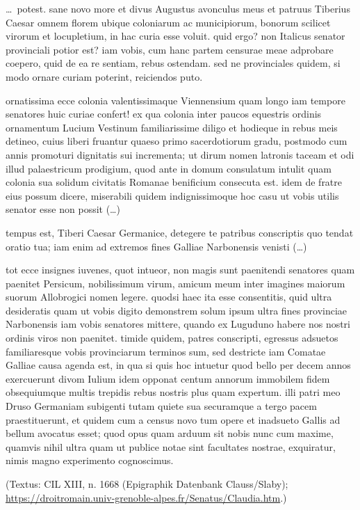 \dots\ potest. sane novo more et divus Augustus avonculus meus et patruus Tiberius Caesar omnem florem ubique coloniarum ac municipiorum, bonorum scilicet virorum et locupletium, in hac curia esse voluit. quid ergo? non Italicus senator provinciali potior est? iam vobis, cum hanc partem censurae meae adprobare coepero, quid de ea re sentiam, rebus ostendam. sed ne provinciales quidem, si modo ornare curiam poterint, reiciendos puto.

ornatissima ecce colonia valentissimaque Viennensium quam longo iam tempore senatores huic curiae confert! ex qua colonia inter paucos equestris ordinis ornamentum Lucium Vestinum familiarissime diligo et hodieque in rebus meis detineo, cuius liberi fruantur quaeso primo sacerdotiorum gradu, postmodo cum annis promoturi dignitatis sui incrementa; ut dirum nomen latronis taceam et odi illud palaestricum prodigium, quod ante in domum consulatum intulit quam colonia sua solidum civitatis Romanae benificium consecuta est. idem de fratre eius possum dicere, miserabili quidem indignissimoque hoc casu ut vobis utilis senator esse non possit (\dots)

tempus est, Tiberi Caesar Germanice, detegere te patribus conscriptis quo tendat oratio tua; iam enim ad extremos fines Galliae Narbonensis venisti (\dots)

tot ecce insignes iuvenes, quot intueor, non magis sunt paenitendi 
senatores quam paenitet Persicum, nobilissimum virum, amicum meum inter imagines maiorum suorum Allobrogici nomen legere. quodsi haec ita esse consentitis, quid ultra desideratis quam ut vobis digito demonstrem solum ipsum ultra fines provinciae Narbonensis iam vobis senatores mittere, quando ex Luguduno habere nos nostri ordinis viros non paenitet. timide quidem, patres conscripti, egressus adsuetos familiaresque vobis provinciarum terminos sum, sed destricte iam Comatae Galliae causa agenda est, in qua si quis hoc intuetur quod bello per decem annos exercuerunt divom Iulium idem opponat centum annorum immobilem fidem obsequiumque multis trepidis rebus nostris plus quam expertum. illi patri meo Druso Germaniam subigenti tutam quiete sua securamque a tergo pacem praestituerunt, et quidem cum a census novo tum opere et inadsueto Gallis ad bellum avocatus esset; quod opus quam
arduum sit nobis nunc cum maxime, quamvis nihil ultra quam ut
publice notae sint facultates nostrae, exquiratur, nimis magno
experimento cognoscimus.

\noindent (Textus: CIL XIII, n. 1668 (Epigraphik Datenbank Clauss/Slaby); \url{https://droitromain.univ-grenoble-alpes.fr/Senatus/Claudia.htm}.)

